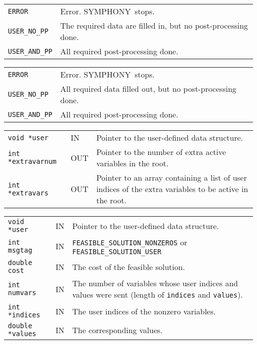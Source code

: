 \documentclass[twoside,11pt]{article}
\begin{document}
{\newpage
\clearpage
\samepage \begin{tabular}{lp{371.195pt}}
{\tt ERROR} & Error. {\sc SYMPHONY}\ stops. \\ 
{\tt USER\_NO\_PP} & The required data are filled in, but no
post-processing done. \\ 
{\tt USER\_AND\_PP} & All required post-processing done. \\ 
\end{tabular}
}

{\newpage
\clearpage
\samepage \begin{tabular}{lp{371.195pt}}
{\tt ERROR} & Error. {\sc SYMPHONY}\ stops. \\ 
{\tt USER\_NO\_PP} & All required data  filled out, but no
post-processing done. \\ 
{\tt USER\_AND\_PP} & All required post-processing done. \\ 
\end{tabular}
}

{\newpage
\clearpage
\samepage \begin{tabular}{llp{297.865pt}}
{\tt void *user} & IN & Pointer to the user-defined data structure. \\ 
{\tt int *extravarnum} & OUT & Pointer to the number of extra active
variables in the root. \\ 
{\tt int *extravars} & OUT & Pointer to an array containing a list of
user indices of the extra variables to be active in the root. \\ 
\end{tabular}
}

{\newpage
\clearpage
\samepage \begin{tabular}{llp{301.645pt}}
{\tt void *user} & IN & Pointer to the user-defined data structure. \\ 
{\tt int msgtag} &    IN & {\tt FEASIBLE\_SOLUTION\_NONZEROS} or {\tt
FEASIBLE\_SOLUTION\_USER} \\ 
{\tt double cost}  &    IN & The cost of the feasible solution.\\ 
{\tt int numvars} &  IN & The number of variables whose user indices and
values were sent (length of {\tt indices} and {\tt values}). \\ 
{\tt int *indices} &  IN & The user indices of the nonzero variables. \\ 
{\tt double *values} & IN & The corresponding values. \\ 
\end{tabular}
}
\end{document}
